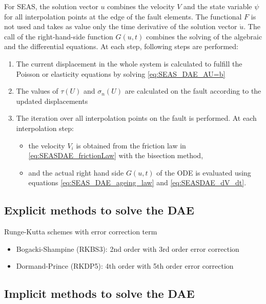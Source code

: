 \documentclass{report}
\begin{document}
For SEAS, the solution vector $u$ combines the velocity $V$ and the state variable $\psi$ for all interpolation points at the edge of the fault elements. The functional $F$ is not used and takes as value only the time derivative of the solution vector $\dot{u}$. The call of the right-hand-side function $G(u,t)$ combines the solving of the algebraic and the differential equations. At each step, following steps are performed: 
\begin{enumerate}
    \item The current displacement in the whole system is calculated to fulfill the Poisson or elasticity equations by solving \autoref{eq:SEAS_DAE_AU=b} \\
    \item The values of $\tau(U)$ and $\sigma_n(U)$ are calculated on the fault according to the updated displacements \\
    \item The iteration over all interpolation points on the fault is performed. At each interpolation step: \begin{itemize}
        \item the velocity $V_i$ is obtained from the friction law in \autoref{eq:SEASDAE_frictionLaw} with the bisection method,
        \item and the actual right hand side $G(u,t)$ of the ODE is evaluated using equations \ref{eq:SEAS_DAE_ageing_law} and \ref{eq:SEASDAE_dV_dt}.
    \end{itemize}
\end{enumerate}


\subsection{Explicit methods to solve the DAE}
Runge-Kutta schemes with error correction term 
\begin{itemize}
    \item Bogacki-Shampine (RKBS3): 2nd order with 3rd order error correction \\
    \item Dormand-Prince (RKDP5): 4th order with 5th order error correction 
\end{itemize}

\subsection{Implicit methods to solve the DAE}
\end{document}
